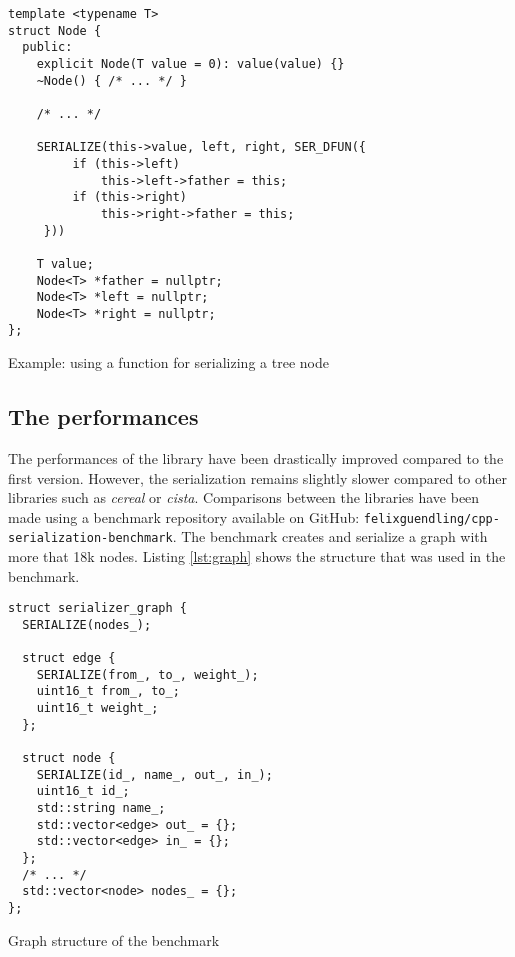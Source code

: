 \begin{listing}[ht!]
\begin{verbatim}
template <typename T>
struct Node {
  public:
    explicit Node(T value = 0): value(value) {}
    ~Node() { /* ... */ }

    /* ... */

    SERIALIZE(this->value, left, right, SER_DFUN({
         if (this->left)
             this->left->father = this;
         if (this->right)
             this->right->father = this;
     }))

    T value;
    Node<T> *father = nullptr;
    Node<T> *left = nullptr;
    Node<T> *right = nullptr;
};
\end{verbatim}
\caption{Example: using a function for serializing a tree node}
\label{lst:treenode}
\end{listing}

\clearpage{}
\subsection{The performances}

The performances of the library have been drastically improved compared to the
first version. However, the serialization remains slightly slower compared to
other libraries such as \textit{cereal} or \textit{cista}. Comparisons between
the libraries have been made using a benchmark repository available on GitHub:
\texttt{felixguendling/cpp-serialization-benchmark}. The benchmark creates and
serialize a graph with more that 18k nodes. Listing \ref{lst:graph} shows the
structure that was used in the benchmark.

\begin{listing}[ht!]
\begin{verbatim}
struct serializer_graph {
  SERIALIZE(nodes_);

  struct edge {
    SERIALIZE(from_, to_, weight_);
    uint16_t from_, to_;
    uint16_t weight_;
  };

  struct node {
    SERIALIZE(id_, name_, out_, in_);
    uint16_t id_;
    std::string name_;
    std::vector<edge> out_ = {};
    std::vector<edge> in_ = {};
  };
  /* ... */
  std::vector<node> nodes_ = {};
};
\end{verbatim}
\caption{Graph structure of the benchmark}
\label{lst:graph}
\end{listing}

